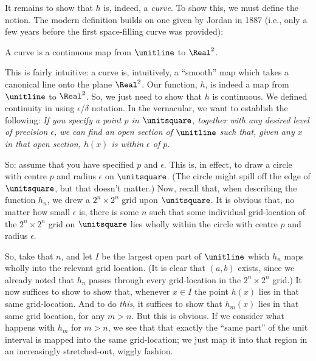 \documentclass[../../../include/open-logic-section]{subfiles}
\begin{document}
It remains to show that $h$ is, indeed, a \emph{curve}. To show this,
we must define the notion. The modern definition builds on one given
by Jordan in 1887 (i.e., only a few years before the first
space-filling curve was provided): 

\begin{defn}
A curve is a continuous map from $\unitline$ to $\Real^2$. 
\end{defn}

This is fairly intuitive: a curve is, intuitively, a ``smooth'' map
which takes a canonical line onto the plane $\Real^2$. Our function,
$h$, is indeed a map from $\unitline$ to $\Real^2$. So, we just need
to show that $h$ is continuous. We defined continuity in
 using $\epsilon$/$\delta$ notation. In the
vernacular, we want to establish the following: \emph{If you specify a
point $p$ in $\unitsquare$, together with any desired level of
precision $\epsilon$, we can find an open section of $\unitline$ such
that, given any $x$ in that open section, $h(x)$ is within $\epsilon$
of $p$.}

So: assume that you have specified $p$ and $\epsilon$. This is, in
effect, to draw a circle with centre $p$ and radius $\epsilon$ on
$\unitsquare$. (The circle might spill off the edge of $\unitsquare$,
but that doesn't matter.) Now, recall that, when describing the
function $h_n$, we drew a $2^n \times 2^n$ grid upon $\unitsquare$. It
is obvious that, no matter how small $\epsilon$ is, there is some $n$
such that some individual grid-location of the $2^n \times 2^n$ grid
on $\unitsquare$ lies wholly within the circle with centre $p$ and
radius $\epsilon$. 

So, take that $n$, and let $I$ be the largest open part of $\unitline$
which $h_n$ maps wholly into the relevant grid location. (It is clear
that $(a,b)$ exists, since we already noted that $h_n$ passes through
every grid-location in the $2^n\times 2^n$ grid.) It now suffices to
show to show that, whenever $x \in I$ the point $h(x)$ lies in that
same grid-location. And to do \emph{this}, it suffices to show that
$h_m(x)$ lies in that same grid location, for any $m > n$. But this is
obvious. If we consider what happens with $h_m$ for $m > n$, we see
that that exactly the ``same part'' of the unit interval is mapped
into the same grid-location; we just map it into that region in an
increasingly stretched-out, wiggly fashion. 
\end{document}
